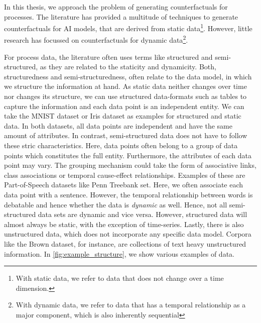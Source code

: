 \documentclass[./../../paper.tex]{subfiles}
\begin{document}
In this thesis, we approach the problem of generating counterfactuals for processes. The literature has provided a multitude of techniques to generate counterfactuals for AI models, that are derived from static data\footnote{With static data, we refer to data that does not change over a time dimension.}. However, little research has focussed on counterfactuals for dynamic data\footnote{With dynamic data, we refer to data that has a temporal relationship as a major component, which is also inherently sequential}.  

For process data, the literature often uses terms like structured and semi-structured, as they are related to the staticity and dynamicity. Both, structuredness and semi-structuredness, often relate to the data model, in which we structure the information at hand. As static data neither changes over time nor changes its structure, we can use structured data-formats such as tables to capture the information and each data point is an independent entity. We can take the MNIST dataset\autocite{deng_MNISTDatabaseHandwritten_2012} or Iris dataset\autocites{anderson_SpeciesProblemIris_1936,fisher_UseMultipleMeasurements_1936} as examples for structured and static data. In both datasets, all data points are independent and have the same amount of attributes. In contrast, semi-structured data does not have to follow these stric characteristics. Here, data points often belong to a group of data points which constitutes the full entity. Furthermore, the attributes of each data point may vary. The grouping mechanism could take the form of associative links, class associations or temporal cause-effect relationships. Examples of these are Part-of-Speech datasets like Penn Treebank set\autocite{marcus_Buildinglargeannotated_1993}. Here, we often associate each data point with a sentence. However, the temporal relationship between words is debatable and hence whether the data is \emph{dynamic} as well. Hence, not all semi-structured data sets are dynamic and vice versa. However, structured data will almost always be static, with the exception of time-series. Lastly, there is also unstructured data, which does not incorporate any specific data model. Corpora like the Brown dataset\autocite{francis79browncorpus}, for instance, are collections of text heavy unstructured information. In \autoref{fig:example_structure}, we show various examples of data.
\end{document}
